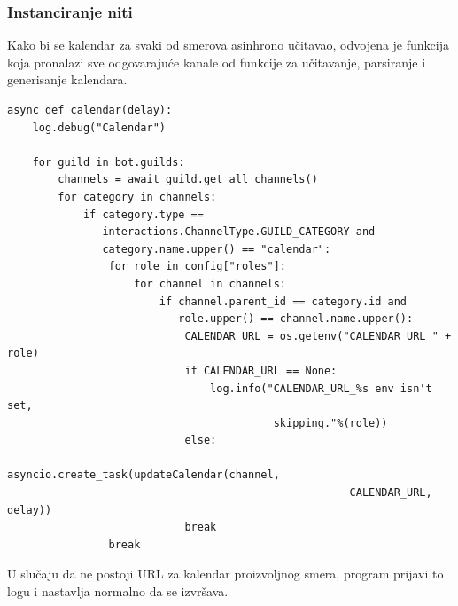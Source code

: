 \documentclass[a4paper,11pt]{article}
\begin{document}
\subsubsection{Instanciranje niti}
Kako bi se kalendar za svaki od smerova asinhrono učitavao, odvojena je funkcija koja pronalazi sve odgovarajuće kanale od funkcije za učitavanje, parsiranje i generisanje kalendara.
\begin{verbatim}
async def calendar(delay):
    log.debug("Calendar")

    for guild in bot.guilds:
        channels = await guild.get_all_channels()
        for category in channels:
            if category.type == 
               interactions.ChannelType.GUILD_CATEGORY and 
               category.name.upper() == "calendar":
                for role in config["roles"]:
                    for channel in channels:
                        if channel.parent_id == category.id and 
                           role.upper() == channel.name.upper():
                            CALENDAR_URL = os.getenv("CALENDAR_URL_" + role)
                            if CALENDAR_URL == None:
                                log.info("CALENDAR_URL_%s env isn't set,
                                          skipping."%(role))
                            else:
                                asyncio.create_task(updateCalendar(channel,
                                                      CALENDAR_URL, delay))
                            break
                break
\end{verbatim}
U slučaju da ne postoji URL za kalendar proizvoljnog smera, program prijavi to logu i nastavlja normalno da se izvršava.
\newpage
\end{document}
